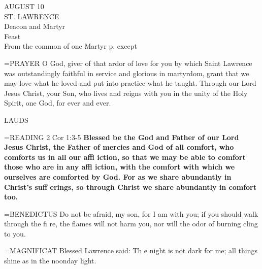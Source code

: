 \begin{center}\normalsize AUGUST 10\\
\footnotesize ST. LAWRENCE\\
\footnotesize Deacon and Martyr\\
\footnotesize Feast\\
\footnotesize From the common of one Martyr p.    except\\
\end{center}

\hangindent=\parindent \small{PRAYER 
O God, giver of that ardor of love for you
by which Saint Lawrence was outstandingly faithful in service
and glorious in martyrdom,
grant that we may love what he loved
and put into practice what he taught.
Through our Lord Jesus Christ, your Son,
who lives and reigns with you in the unity of the Holy Spirit,
one God, for ever and ever.\\}
 
\begin{flushleft}\normalsize LAUDS\\\end{flushleft}

\hangindent=\parindent \small{READING} 2 Cor 1:3-5 \textbf{Blessed be the God and Father of our Lord Jesus
Christ, the Father of mercies and God of all comfort, who comforts
us in all our affl iction, so that we may be able to comfort those
who are in any affl iction, with the comfort with which we ourselves
are comforted by God. For as we share abundantly in Christ’s
suff erings, so through Christ we share abundantly in comfort too.\\}
 
\hangindent=\parindent \small{BENEDICTUS  Do not be afraid, my son, for I am with you; if you should
walk through the fi re, the flames will not harm you, nor will the odor
of burning cling to you.\\}
 
\hangindent=\parindent \small{MAGNIFICAT  Blessed Lawrence said: Th e night is not dark for me; all
things shine as in the noonday light.\\}
 
